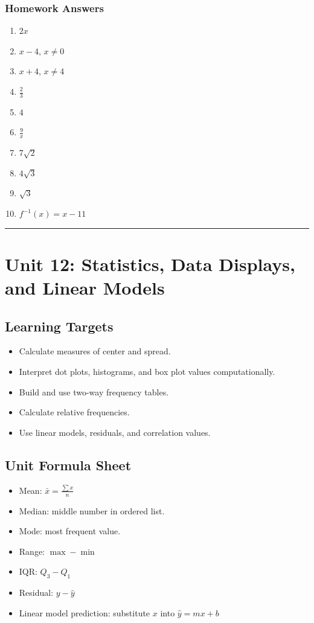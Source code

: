 \documentclass[11pt]{book}
\begin{document}
\subsection{Homework Answers}

\begin{enumerate}
\item \(2x\)
\item \(x-4\), \(x\ne0\)
\item \(x+4\), \(x\ne4\)
\item \(\frac23\)
\item \(4\)
\item \(\frac9x\)
\item \(7\sqrt2\)
\item \(4\sqrt3\)
\item \(\sqrt3\)
\item \(f^{-1}(x)=x-11\)
\end{enumerate}

\bigskip\hrule\bigskip

\chapter{Unit 12: Statistics, Data Displays, and Linear Models}

\section{Learning Targets}

\begin{itemize}
\item Calculate measures of center and spread.
\item Interpret dot plots, histograms, and box plot values computationally.
\item Build and use two-way frequency tables.
\item Calculate relative frequencies.
\item Use linear models, residuals, and correlation values.
\end{itemize}

\section{Unit Formula Sheet}

\begin{itemize}
\item Mean: \(\bar{x}=\frac{\sum x}{n}\)
\item Median: middle number in ordered list.
\item Mode: most frequent value.
\item Range: \(\max-\min\)
\item IQR: \(Q_3-Q_1\)
\item Residual: \(y-\hat y\)
\item Linear model prediction: substitute \(x\) into \(\hat y=mx+b\)
\end{itemize}
\end{document}
